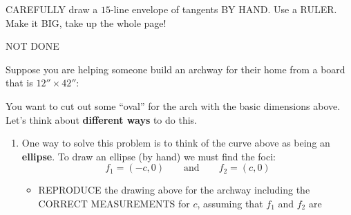 \documentclass[noauthor,nooutcomes,hints,handout]{ximera}
\begin{document}
\mynewpage






\begin{question}
  CAREFULLY draw a $15$-line envelope of tangents BY HAND. Use a
  RULER. Make it BIG, take up the whole page!
  \begin{freeResponse}
    NOT DONE
  \end{freeResponse}
\end{question}
\mynewpage





\begin{question}
  Suppose you are helping someone build an archway for their home from
  a board that is $12''\times 42''$:
  \begin{center}
  \end{center}
  You want to cut out some ``oval'' for the arch with the basic
  dimensions above. Let's think about \textbf{different ways} to do
  this.
  \begin{enumerate}
  \item One way to solve this problem is to think of the curve above
    as being an \textbf{ellipse}. To draw an ellipse (by hand) we must
    find the foci:
    \[
    f_1 = (-c,0) \qquad \text{and} \qquad f_2 = (c,0)
    \]
    \begin{itemize}
    \item REPRODUCE the drawing above for the archway including the
      CORRECT MEASUREMENTS for $c$, assuming that $f_1$ and $f_2$ are

\end{itemize}
\end{enumerate}
\end{question}
\end{document}
